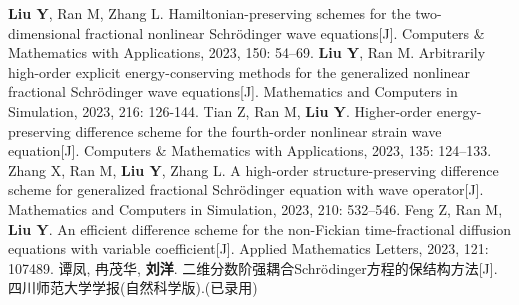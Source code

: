    \begin{mypaper}
      \begin{thebibliography}{99}  
       \textbf{Liu Y}, Ran M, Zhang L. Hamiltonian-preserving schemes for the two-dimensional fractional nonlinear Schrödinger wave equations[J]. Computers \& Mathematics with Applications, 2023, 150: 54–69.
       \textbf{Liu Y}, Ran M. Arbitrarily high-order explicit energy-conserving methods for the generalized nonlinear fractional Schrödinger wave equations[J]. Mathematics and Computers in Simulation, 2023, 216: 126-144.
       Tian Z, Ran M, \textbf{Liu Y}. Higher-order energy-preserving difference scheme for the fourth-order nonlinear strain wave equation[J]. Computers \& Mathematics with Applications, 2023, 135: 124–133.
       Zhang X, Ran M, \textbf{Liu Y}, Zhang L. A high-order structure-preserving difference scheme for generalized fractional Schrödinger equation with wave operator[J]. Mathematics and Computers in Simulation, 2023, 210: 532–546.
       Feng Z, Ran M, \textbf{Liu Y}. An efficient difference scheme for the non-Fickian time-fractional diffusion equations with variable coefficient[J]. Applied Mathematics Letters, 2023, 121: 107489.
       谭凤, 冉茂华, \textbf{刘洋}. 二维分数阶强耦合Schr{\"o}dinger方程的保结构方法[J]. 四川师范大学学报(自然科学版).(已录用)
      \end{thebibliography}
   \end{mypaper}
   